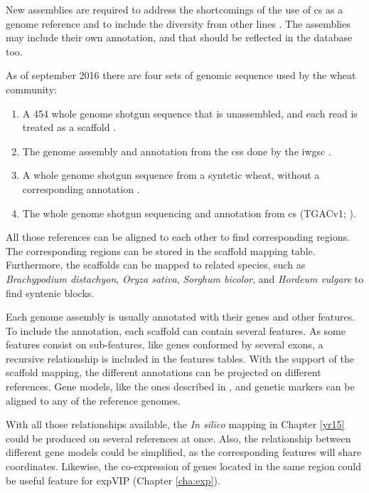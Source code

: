 New assemblies are required to address the shortcomings of the use of \acrshort{cs} as a genome reference and to include the diversity from other lines \citep{Allen2016,Winfield2016}. 
The assemblies may include their own annotation, and that should be reflected in the database too. 

As of september 2016 there are four sets of genomic sequence used by the wheat community:
\begin{enumerate}
	\item  A 454 whole genome shotgun sequence that is unassembled, and each read is treated as a scaffold \citep{Brenchley2012}.
	\item The genome assembly and annotation from the \gls{css} done by the \acrshort{iwgsc} \citep{Mayer2014}.
	\item A whole genome shotgun sequence from a syntetic wheat, without a corresponding annotation \citep{Chapman2015}.
	\item The whole genome shotgun sequencing and annotation from \acrshort{cs} (TGACv1; \citealt{Clark2016}).
\end{enumerate}

All those references can be aligned to each other to find corresponding regions. 
The corresponding regions can be stored in the scaffold mapping table. 
Furthermore, the scaffolds can be mapped to related species, such as \textit{Brachypodium distachyon}, \textit{Oryza sativa}, \textit{Sorghum bicolor}, and \textit{Hordeum vulgare} to find syntenic blocks. 

Each genome assembly is usually annotated with their genes and other features. 
To include the annotation, each scaffold can contain several features. 
As some features consist on sub-features, like genes conformed by several exons, a recursive relationship is included in the features tables. 
With the support of the scaffold mapping, the different annotations can be projected on different references. 
Gene models, like the ones described in \citep{Krasileva2013}, and  genetic markers can be aligned to any of the reference genomes.

With all those relationships available, the \textit{In silico} mapping in Chapter \ref{yr15} could be produced on several references at once. 
Also, the relationship between different gene models could be simplified, as the corresponding features will share coordinates.
Likewise, the co-expression of genes located in the same region could be useful feature for expVIP (Chapter \ref{cha:exp}). 

